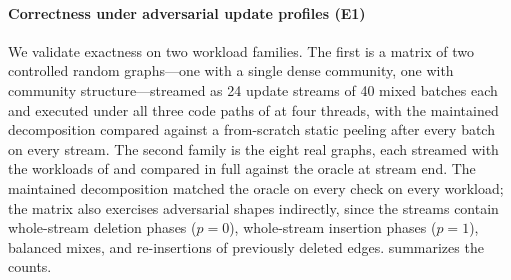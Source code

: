 \paragraph{Correctness under adversarial update profiles (E1)}
\label{par:correctness}
We validate exactness on two workload families.
The first is a matrix of two controlled random graphs---one with a single dense community, one with community structure---streamed as 24 update streams of 40 mixed batches each and executed under all three code paths of  at four threads, with the maintained decomposition compared against a from-scratch static peeling after every batch on every stream.
The second family is the eight real graphs, each streamed with the workloads of  and compared in full against the oracle at stream end.
The maintained decomposition matched the oracle on every check on every workload; the matrix also exercises adversarial shapes indirectly, since the streams contain whole-stream deletion phases ($p{=}0$), whole-stream insertion phases ($p{=}1$), balanced mixes, and re-insertions of previously deleted edges.
 summarizes the counts.

\begin{table}[tb]
\caption{Differential-testing summary (maintained vs.\ static oracle; the synthetic matrix executes each stream under all three code paths of , the real graphs are checked at stream end).}
\label{tab:correctness}

\end{table}

